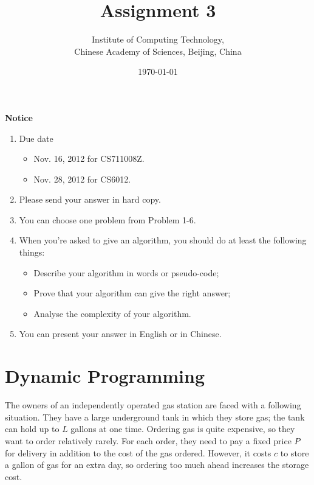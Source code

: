 %
%




\title{Assignment 3}
\author{Institute of Computing Technology, \\
        Chinese Academy of Sciences, Beijing, China }
\date{\today}
\maketitle

\noindent
\textbf{Notice}
\begin{enumerate}
\item Due date
      \begin{itemize}
      \item Nov. 16, 2012 for CS711008Z.
      \item Nov. 28, 2012 for CS6012.
      \end{itemize}
\item Please send your answer in hard copy.
\item You can choose one problem from Problem 1-6.
\item When you're asked to give an algorithm, you should do at least the following things:
      \begin{itemize}
      \item Describe your algorithm in words or pseudo-code;
      \item Prove that your algorithm can give the right answer;
      \item Analyse the complexity of your algorithm.
      \end{itemize}
\item You can present your answer in English or in Chinese.
\end{enumerate}
%
%

\section{Dynamic Programming}
\noindent
The owners of an independently operated gas station are faced with a following situation. 
They have a large underground tank in which they store gas; 
the tank can hold up to $L$ gallons at one time. 
Ordering gas is quite expensive, so they want to order relatively rarely. 
For each order, 
they need to pay a fixed price $P$ for delivery in addition to the cost of the gas ordered. 
However, it costs $c$ to store a gallon of gas for an extra day, 
so ordering too much ahead increases the storage cost.

